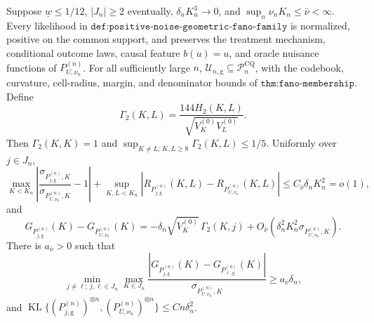 Suppose \(\underline w\leq1/12\), \(|J_n|\geq2\) eventually, \(\delta_nK_n^3\to0\), and \(\sup_n\nu_nK_n\leq\bar\nu<\infty\).  Every likelihood in \(\texttt{def:positive-noise-geometric-fano-family}\) is normalized, positive on the common support, and preserves the treatment mechanism, conditional outcome laws, causal feature \(b(u)=u\), and oracle nuisance functions of \(P_{U,\nu_n}^{(n)}\).  For all sufficiently large \(n\), \(\mathcal U_{n,\mathrm g}\subseteq\mathcal P_n^{\mathrm{CQ}}\), with the codebook, curvature, cell-radius, margin, and denominator bounds of \(\texttt{thm:fano-membership}\).  Define
\[
 \Gamma_2(K,L)=\frac{144H_2(K,L)}{\sqrt{V_K^{(0)}V_L^{(0)}}}.
\]
Then \(\Gamma_2(K,K)=1\) and \(\sup_{K\ne L;\,K,L\geq8}\Gamma_2(K,L)\leq1/5\).  Uniformly over \(j\in J_n\),
\[
 \max_{K<K_n}\left|\frac{\sigma_{P_{j,\mathrm g}^{(n)},K}}
 {\sigma_{P_{U,\nu_n}^{(n)},K}}-1\right|
 +\sup_{K,L<K_n}\left|R_{P_{j,\mathrm g}^{(n)}}(K,L)
 -R_{P_{U,\nu_n}^{(n)}}(K,L)\right|
 \leq C_{\bar\nu}\delta_nK_n^2=o(1),
\]
and
\[
 G_{P_{j,\mathrm g}^{(n)}}(K)-G_{P_{U,\nu_n}^{(n)}}(K)
 =-\delta_n\sqrt{V_K^{(0)}}\,\Gamma_2(K,j)
 +O_{\bar\nu}\!\left(\delta_n^2K_n^2\sigma_{P_{U,\nu_n}^{(n)},K}\right).
\]
There is \(a_{\bar\nu}>0\) such that
\[
 \min_{j\ne\ell;\,j,\ell\in J_n}\max_{K\in J_n}
 \frac{|G_{P_{j,\mathrm g}^{(n)}}(K)-G_{P_{\ell,\mathrm g}^{(n)}}(K)|}
 {\sigma_{P_{U,\nu_n}^{(n)},K}}
 \geq a_{\bar\nu}\delta_n,
\]
and \(\operatorname{KL}\{(P_{j,\mathrm g}^{(n)})^{\otimes n},(P_{U,\nu_n}^{(n)})^{\otimes n}\}\leq Cn\delta_n^2\).